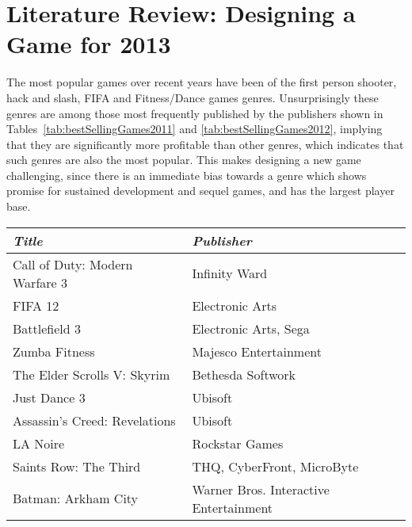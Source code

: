 
\section{Literature Review: Designing a Game for 2013}
\label{sec:litRevDesigningGame}

The most popular games over recent years have been of the first person shooter, hack and slash, FIFA and Fitness/Dance games genres. Unsurprisingly these genres are among those most frequently published by the publishers shown in Tables~\ref{tab:bestSellingGames2011} and \ref{tab:bestSellingGames2012}, implying that they are significantly more profitable than other genres, which indicates that such genres are also the most popular. This makes designing a new game challenging, since there is an immediate bias towards a genre which shows promise for sustained development and sequel games, and has the largest player base. 

\begin{table*}[!ht]
	\begin{tabular}{p{15em} p{13em}}
		\toprule
		\emph{Title} & \emph{Publisher}\\
		\midrule
	Call of Duty: Modern Warfare 3 & Infinity Ward
	\\
	FIFA 12 & Electronic Arts
	\\
	Battlefield 3 & Electronic Arts, Sega
	\\
	Zumba Fitness & Majesco Entertainment
	\\
	The Elder Scrolls V: Skyrim & Bethesda Softwork
	\\
	Just Dance 3 & Ubisoft
	\\
	Assassin's Creed: Revelations & Ubisoft
	\\
	LA Noire & Rockstar Games
	\\
	Saints Row: The Third & THQ, CyberFront, MicroByte
	\\
	Batman: Arkham City & Warner Bros. Interactive Entertainment 
	\\
	\bottomrule
	\end{tabular}
	\caption[Best selling games of 2011]{Best selling games of 2011.}
	\label{tab:bestSellingGames2011}
\end{table*}

